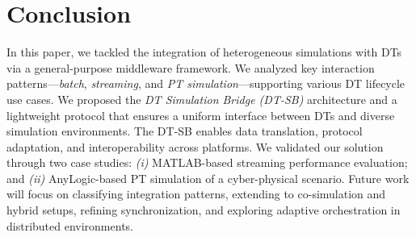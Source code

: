 \documentclass[sigconf]{acmart}
\begin{document}

\maketitle








\section{Conclusion}
\label{sec:conclusion}

In this paper, we tackled the integration of heterogeneous simulations with DTs via a general-purpose middleware framework. We analyzed key interaction patterns---\emph{batch}, \emph{streaming}, and \emph{PT simulation}---supporting various DT lifecycle use cases. We proposed the \emph{DT Simulation Bridge (DT-SB)} architecture and a lightweight protocol that ensures a uniform interface between DTs and diverse simulation environments. The DT-SB enables data translation, protocol adaptation, and interoperability across platforms. We validated our solution through two case studies: \textit{(i)} MATLAB-based streaming performance evaluation; and \textit{(ii)} AnyLogic-based PT simulation of a cyber-physical scenario. Future work will focus on classifying integration patterns, extending to co-simulation and hybrid setups, refining synchronization, and exploring adaptive orchestration in distributed environments.



\end{document}
